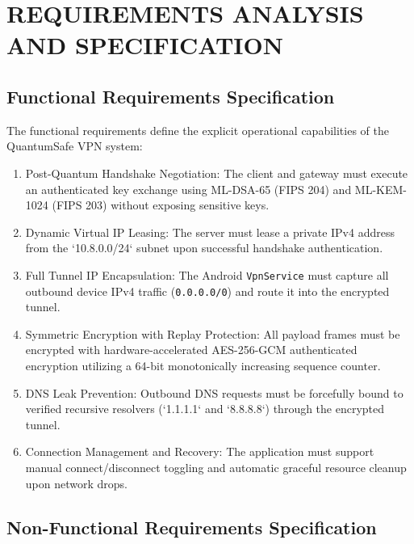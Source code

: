 
\chapter{REQUIREMENTS ANALYSIS AND SPECIFICATION}
\label{chap:requirements}

\section{Functional Requirements Specification}
\label{sec:functional_requirements}

The functional requirements define the explicit operational capabilities of the QuantumSafe VPN system:
\begin{enumerate}[label=FR-\arabic*, leftmargin=1.8cm]
    \item Post-Quantum Handshake Negotiation: The client and gateway must execute an authenticated key exchange using ML-DSA-65 (FIPS 204) and ML-KEM-1024 (FIPS 203) without exposing sensitive keys.
    \item Dynamic Virtual IP Leasing: The server must lease a private IPv4 address from the `10.8.0.0/24` subnet upon successful handshake authentication.
    \item Full Tunnel IP Encapsulation: The Android \texttt{VpnService} must capture all outbound device IPv4 traffic (\texttt{0.0.0.0/0}) and route it into the encrypted tunnel.
    \item Symmetric Encryption with Replay Protection: All payload frames must be encrypted with hardware-accelerated AES-256-GCM authenticated encryption utilizing a 64-bit monotonically increasing sequence counter.
    \item DNS Leak Prevention: Outbound DNS requests must be forcefully bound to verified recursive resolvers (`1.1.1.1` and `8.8.8.8`) through the encrypted tunnel.
    \item Connection Management and Recovery: The application must support manual connect/disconnect toggling and automatic graceful resource cleanup upon network drops.
\end{enumerate}

\section{Non-Functional Requirements Specification}
\label{sec:non_functional_requirements}

